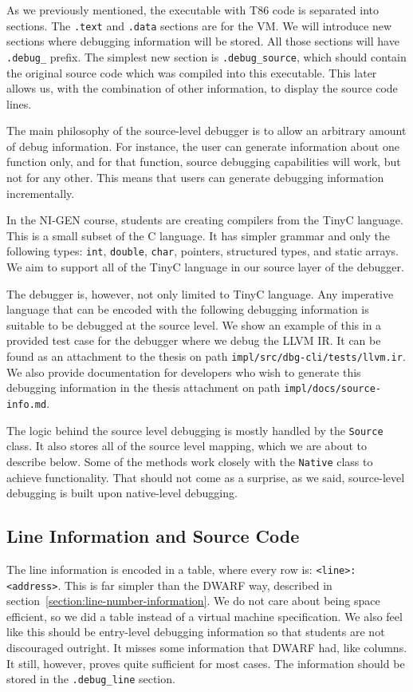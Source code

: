 As we previously mentioned, the executable with T86 code is separated into
sections. The \texttt{.text} and \texttt{.data} sections are for the VM. We
will introduce new sections where debugging information will be stored. All
those sections will have \verb|.debug_| prefix. The simplest new section is
\verb|.debug_source|, which should contain the original source code which was
compiled into this executable. This later allows us, with the combination of
other information, to display the source code lines.

The main philosophy of the source-level debugger is to allow an arbitrary
amount of debug information. For instance, the user can generate information
about one function only, and for that function, source debugging capabilities
will work, but not for any other. This means that users can generate debugging
information incrementally.

In the NI-GEN course, students are creating compilers from the TinyC language.
This is a small subset of the C language. It has simpler grammar and only
the following types: \texttt{int}, \texttt{double}, \texttt{char}, pointers,
structured types, and static arrays. We aim to support all of the TinyC
language in our source layer of the debugger.

The debugger is, however, not only limited to TinyC language. Any imperative
language that can be encoded with the following debugging information is
suitable to be debugged at the source level. We show an example of this in a
provided test case for the debugger where we debug the LLVM IR. It can be found
as an attachment to the thesis on path \texttt{impl/src/dbg-cli/tests/llvm.ir}.
We also provide documentation for developers who wish to generate this
debugging information in the thesis attachment on path
\texttt{impl/docs/source-info.md}.

The logic behind the source level debugging is mostly handled by the
\texttt{Source} class. It also stores all of the source level mapping, which we
are about to describe below. Some of the methods work closely with the
\texttt{Native} class to achieve functionality. That should not come as a
surprise, as we said, source-level debugging is built upon native-level
debugging.

\subsection{Line Information and Source Code}
The line information is encoded in a table, where every row is:
\texttt{<line>:<address>}. This is far simpler than the DWARF way, described in
section~\ref{section:line-number-information}. We do not care about being space
efficient, so we did a table instead of a virtual machine specification. We
also feel like this should be entry-level debugging information so that
students are not discouraged outright. It misses some information that DWARF
had, like columns. It still, however, proves quite sufficient for most cases.
The information should be stored in the \verb|.debug_line| section.

